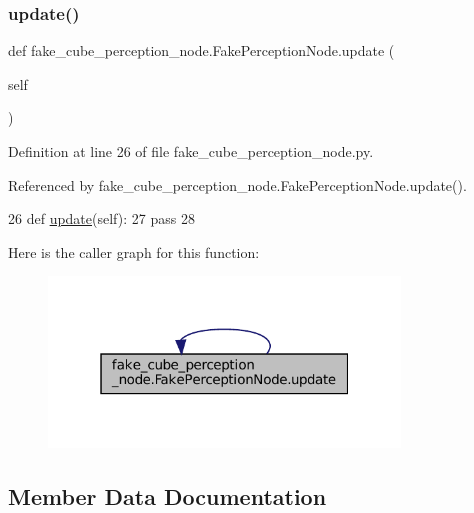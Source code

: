 \subsubsection{\texorpdfstring{update()}{update()}\hspace{0.1cm}{\footnotesize\ttfamily [2/2]}}
{\footnotesize\ttfamily def fake\+\_\+cube\+\_\+perception\+\_\+node.\+Fake\+Perception\+Node.\+update (\begin{DoxyParamCaption}\item[{}]{self }\end{DoxyParamCaption})}



Definition at line 26 of file fake\+\_\+cube\+\_\+perception\+\_\+node.\+py.



Referenced by fake\+\_\+cube\+\_\+perception\+\_\+node.\+Fake\+Perception\+Node.\+update().


\begin{DoxyCode}
26     \textcolor{keyword}{def }\hyperlink{classfake__cube__perception__node_1_1FakePerceptionNode_ae73741e7f84f057cbf109698e70a2515}{update}(self):
27         \textcolor{keywordflow}{pass}
28 
\end{DoxyCode}
Here is the caller graph for this function\+:
\nopagebreak
\begin{figure}[H]
\begin{center}
\leavevmode
\includegraphics[width=265pt]{classfake__cube__perception__node_1_1FakePerceptionNode_ae73741e7f84f057cbf109698e70a2515_icgraph}
\end{center}
\end{figure}


\subsection{Member Data Documentation}
\mbox{\label{classfake__cube__perception__node_1_1FakePerceptionNode_a5af28c647aa93cf6bb90d4228e27667f}} 
